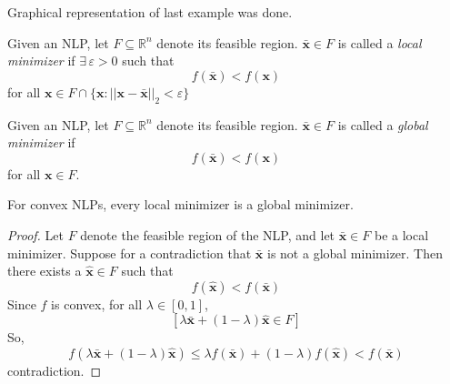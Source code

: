 Graphical representation of last example was done.
\begin{defbox}
    \begin{definition}
        Given an NLP, let $ F\subseteq \mathbb{R}^{n} $ denote its feasible region.
        $ \bm{\bar{x}}\in F $ is called a \emph{local minimizer} if $ \exists\,\varepsilon>0 $
        such that
        \[ f(\bm{\bar{x}})<f(\bm{x}) \]
        for all $ \bm{x}\in F\cap \{\bm{x}:||\bm{x}-\bm{\bar{x}}||_2 < \varepsilon\} $
    \end{definition}
\end{defbox}
\begin{defbox}
    \begin{definition}
        Given an NLP, let $ F\subseteq \mathbb{R}^{n} $ denote its feasible region.
        $ \bm{\bar{x}}\in F $ is called a \emph{global minimizer} if
        \[ f(\bm{\bar{x}})<f(\bm{x}) \]
        for all $ \bm{x}\in F $.
    \end{definition}
\end{defbox}
\begin{thmbox}
    \begin{theorem}
        For convex NLPs, every local minimizer is a global minimizer.
    \end{theorem}
\end{thmbox}

\begin{proof}
    Let $ F $ denote the feasible region of the NLP, and let $ \bm{\bar{x}}\in F $ be
    a local minimizer. Suppose for a contradiction that $ \bm{\bar{x}} $ is not
    a global minimizer. Then there exists a $ \bm{\hat{x}}\in F $ such that
    \[ f(\bm{\hat{x}})<f(\bm{\bar{x}}) \]
    Since $ f $ is convex, for all $ \lambda\in[0,1] $,
    \[ \left[ \lambda \bm{\bar{x}}+(1-\lambda)\bm{\hat{x}}\in F \right] \]
    So,
    \[ f(\lambda \bm{\bar{x}}+(1-\lambda)\bm{\hat{x}})\leqslant
        \lambda f(\bm{\bar{x}})+(1-\lambda)f(\bm{\hat{x}})<f(\bm{\bar{x}}) \]
    contradiction.
\end{proof}

